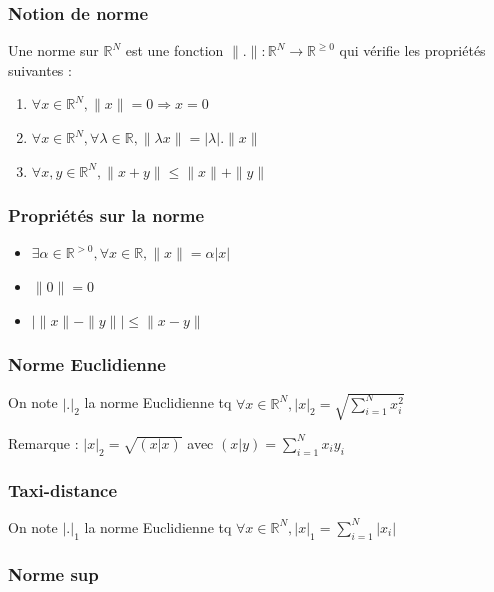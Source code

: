 \documentclass[a4paper,10pt]{article}
\newcommand{\ap}{\rightarrow}
\newcommand{\R}{\mathbb{R}}
\newcommand{\so}{\Rightarrow}
\newcommand{\abs}[1]{\left\vert #1 \right\vert}
\newcommand{\norme}[1]{\parallel #1 \parallel}
\begin{document}
\subsubsection{Notion de norme}

Une norme sur $\R^N$ est une fonction $\norme{.} : \R^N \ap \R^{\geq 0}$ qui vérifie les propriétés suivantes :

\begin{enumerate}
\item{$\forall x \in \R^N, \norme{x} = 0 \so x = 0$}
\item{$\forall x \in \R^N, \forall \lambda \in \R, \norme{\lambda x} = \abs{\lambda}.\norme{x}$}
\item{$\forall x,y \in \R^N, \norme{x+y} \leq \norme{x} + \norme{y}$}
\end{enumerate}

\subsubsection{Propriétés sur la norme}

\begin{itemize}
	\item{$\exists \alpha \in \R^{>0}, \forall x \in \R, \norme{x} = \alpha \abs{x}$}
	\item{$\norme{0} = 0$}
	\item{$\abs{\norme{x} - \norme{y}} \leq \norme{x - y}$}
\end{itemize}

\subsubsection{Norme Euclidienne}

On note $\abs{.}_2$ la norme Euclidienne tq $\forall x \in \R^N, \abs{x}_2 = \sqrt{\sum_{i=1}^N x_i^2}$

Remarque : $\abs{x}_2 = \sqrt{(x \vert x)}$ avec $(x \vert y) = \sum_{i=1}^N x_i y_i$
\subsubsection{Taxi-distance}

On note $\abs{.}_1$ la norme Euclidienne tq $\forall x \in \R^N, \abs{x}_1 = \sum_{i=1}^N \abs{x_i}$

\subsubsection{Norme sup}
\end{document}
